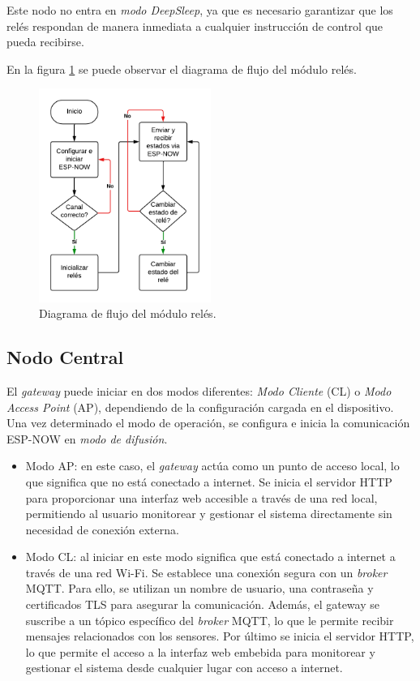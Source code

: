 Este nodo no entra en \textit{modo DeepSleep}, ya que es necesario garantizar que los relés respondan de manera inmediata a cualquier instrucción de control que pueda recibirse.

En la figura \ref{fig:flujoRele} se puede observar el diagrama de flujo del módulo relés. 

\begin{figure}[H]
\centering 
\includegraphics[width=0.5\textwidth]{./Figures/flujo_rele.png}
\caption{Diagrama de flujo del módulo relés.}
\label{fig:flujoRele}
\end{figure}

\subsection{Nodo Central}

El \textit{gateway} puede iniciar en dos modos diferentes: \textit{Modo Cliente} (CL) o \textit{Modo Access Point} (AP), dependiendo de la configuración cargada en el dispositivo. Una vez determinado el modo de operación, se configura e inicia la comunicación ESP-NOW en \textit{modo de difusión}.

\begin{itemize}
	\item Modo AP: en este caso, el \textit{gateway} actúa como un punto de acceso local, lo que significa que no está conectado a internet. Se inicia el servidor HTTP para proporcionar una interfaz web accesible a través de una red local, permitiendo al usuario monitorear y gestionar el sistema directamente sin necesidad de conexión externa.
	\item Modo CL: al iniciar en este modo significa que está conectado a internet a través de una red Wi-Fi. Se establece una conexión segura con un \textit{broker} MQTT. Para ello, se utilizan un nombre de usuario, una contraseña y certificados TLS para asegurar la comunicación. Además, el gateway se suscribe a un tópico específico del \textit{broker} MQTT, lo que le permite recibir mensajes relacionados con los sensores. Por último se inicia el servidor HTTP, lo que permite el acceso a la interfaz web embebida para monitorear y gestionar el sistema desde cualquier lugar con acceso a internet.
\end{itemize}

